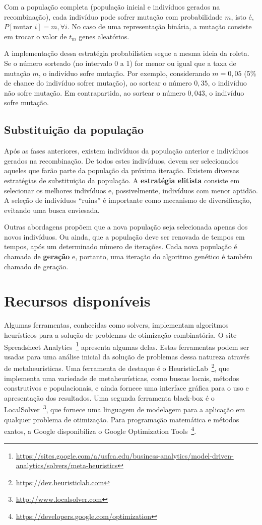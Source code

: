 Com a população completa (população inicial e indivíduos gerados na recombinação), cada indivíduo pode sofrer mutação com probabilidade $m$, isto é, $P[\text{mutar } i] = m, \forall i$. No caso de uma representação binária, a mutação consiste em trocar o valor de $t_m$ genes aleatórios.

A implementação dessa estratégia probabilística segue a mesma ideia da roleta. Se o número sorteado (no intervalo 0 a 1) for menor ou igual que a taxa de mutação $m$, o indivíduo sofre mutação. Por exemplo, considerando $m = 0,05$ (5\% de chance do indivíduo sofrer mutação), ao sortear o número $0,35$, o indivíduo não sofre mutação. Em contrapartida, ao sortear o número $0,043$, o indivíduo sofre mutação.

\subsection{Substituição da população}

Após as fases anteriores, existem indivíduos da população anterior e indivíduos gerados na recombinação. De todos estes indivíduos, devem ser selecionados aqueles que farão parte da população da próxima iteração. Existem diversas estratégias de substituição da população. A \textbf{estratégia elitista} consiste em selecionar os melhores indivíduos e, possivelmente, indivíduos com menor aptidão. A seleção de indivíduos ``ruins'' é importante como mecanismo de diversificação, evitando uma busca enviesada.

Outras abordagens propõem que a nova população seja selecionada apenas dos novos indivíduos. Ou ainda, que a população deve ser renovada de tempos em tempos, após um determinado número de iterações. Cada nova população é chamada de \textbf{geração} e, portanto, uma iteração do algoritmo genético é também chamado de geração.

\section{Recursos disponíveis}

Algumas ferramentas, conhecidas como solvers, implementam algoritmos heurísticos para a solução de problemas de otimização combinatória. O site Spreadsheet Analytics~\footnote{\url{https://sites.google.com/a/usfca.edu/business-analytics/model-driven-analytics/solvers/meta-heuristics}} apresenta algumas delas. Estas ferramentas podem ser usadas para uma análise inicial da solução de problemas dessa natureza através de metaheurísticas. Uma ferramenta de destaque é o HeuristicLab~\footnote{\url{https://dev.heuristiclab.com}}, que implementa uma variedade de metaheurísticas, como buscas locais, métodos construtivos e populacionais, e ainda fornece uma interface gráfica para o uso e apresentação dos resultados. Uma segunda ferramenta black-box é o LocalSolver~\footnote{\url{http://www.localsolver.com}}, que fornece uma linguagem de modelagem para a aplicação em qualquer problema de otimização. Para programação matemática e métodos exatos, a Google disponibiliza o Google Optimization Tools~\footnote{\url{https://developers.google.com/optimization}}.


